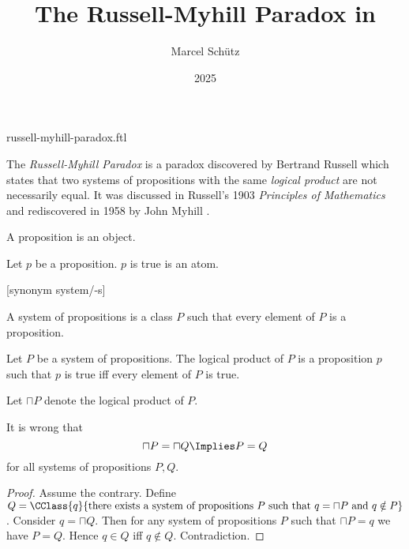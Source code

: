 \documentclass{stex}
\title{The Russell-Myhill Paradox in \Naproche}
\author{Marcel Schütz}
\date{2025}
\begin{document}
\begin{smodule}{russell-myhill-paradox.ftl}


\maketitle

\noindent The \emph{Russell-Myhill Paradox} is a paradox discovered by 
Bertrand Russell which states that two systems of propositions with the same 
\emph{logical product} are not necessarily equal.
It was discussed in Russell's 1903 \emph{Principles of Mathematics}
\cite[Appendix B]{Russell1903} and rediscovered in 1958 by John Myhill
\cite{Myhill1958}.

\begin{forthel}
  \begin{signature*}
    A proposition is an object.
  \end{signature*}

  \begin{signature*}
    Let $p$ be a proposition.
    $p$ is true is an atom.
  \end{signature*}

  [synonym system/-s]

  \begin{definition*}
    A system of propositions is a class $P$ such that every element of $P$ is a proposition.
  \end{definition*}

  \begin{signature*}
    Let $P$ be a system of propositions.
    The logical product of $P$ is a proposition $p$ such that $p$ is true iff every element of $P$ is true.
  \end{signature*}
  
  Let $\sqcap P$ denote the logical product of $P$.
  
  \begin{theorem*}[title=Russell-Myhill Paradox,id=russell_myhill_paradox]
    It is wrong that
    \[ \sqcap P = \sqcap Q \Implies P = Q \]
    for all systems of propositions $P, Q$.
  \end{theorem*}
  \begin{proof}
    Assume the contrary.
    Define $Q = \CClass{q}{\text{there exists a system of propositions } P \text{ such that } q = \sqcap P \text{ and } q \notin P}$.
    Consider $q = \sqcap Q$.
    Then for any system of propositions $P$ such that $\sqcap P = q$ we have $P = Q$.
    Hence $q \in Q$ iff $q \notin Q$.
    Contradiction.
  \end{proof}
\end{forthel}

\printbibliography
{}
\end{smodule}
\end{document}
